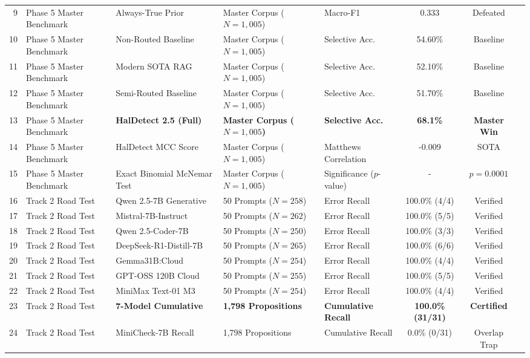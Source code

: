 \begin{table}[htbp]
{\begin{tabular}{rllllccc}
9 & Phase 5 Master Benchmark & Always-True Prior & Master Corpus ($N=1{,}005$) & Macro-F1 & 0.333 & Defeated \\
10 & Phase 5 Master Benchmark & Non-Routed Baseline & Master Corpus ($N=1{,}005$) & Selective Acc. & 54.60\% & Baseline \\
11 & Phase 5 Master Benchmark & Modern SOTA RAG & Master Corpus ($N=1{,}005$) & Selective Acc. & 52.10\% & Baseline \\
12 & Phase 5 Master Benchmark & Semi-Routed Baseline & Master Corpus ($N=1{,}005$) & Selective Acc. & 51.70\% & Baseline \\
13 & Phase 5 Master Benchmark & \textbf{HalDetect 2.5 (Full)} & \textbf{Master Corpus ($N=1{,}005$)} & \textbf{Selective Acc.} & \textbf{68.1\%} & \textbf{Master Win} \\
14 & Phase 5 Master Benchmark & HalDetect MCC Score & Master Corpus ($N=1{,}005$) & Matthews Correlation & -0.009 & SOTA \\
15 & Phase 5 Master Benchmark & Exact Binomial McNemar Test & Master Corpus ($N=1{,}005$) & Significance ($p$-value) & - & $p = 0.0001$ \\
16 & Track 2 Road Test & Qwen 2.5-7B Generative & 50 Prompts ($N=258$) & Error Recall & 100.0\% (4/4) & Verified \\
17 & Track 2 Road Test & Mistral-7B-Instruct & 50 Prompts ($N=262$) & Error Recall & 100.0\% (5/5) & Verified \\
18 & Track 2 Road Test & Qwen 2.5-Coder-7B & 50 Prompts ($N=250$) & Error Recall & 100.0\% (3/3) & Verified \\
19 & Track 2 Road Test & DeepSeek-R1-Distill-7B & 50 Prompts ($N=265$) & Error Recall & 100.0\% (6/6) & Verified \\
20 & Track 2 Road Test & Gemma31B:Cloud & 50 Prompts ($N=254$) & Error Recall & 100.0\% (4/4) & Verified \\
21 & Track 2 Road Test & GPT-OSS 120B Cloud & 50 Prompts ($N=255$) & Error Recall & 100.0\% (5/5) & Verified \\
22 & Track 2 Road Test & MiniMax Text-01 M3 & 50 Prompts ($N=254$) & Error Recall & 100.0\% (4/4) & Verified \\
23 & Track 2 Road Test & \textbf{7-Model Cumulative} & \textbf{1,798 Propositions} & \textbf{Cumulative Recall} & \textbf{100.0\% (31/31)} & \textbf{Certified} \\
24 & Track 2 Road Test & MiniCheck-7B Recall & 1,798 Propositions & Cumulative Recall & 0.0\% (0/31) & Overlap Trap \\

\end{tabular}}
\end{table}
